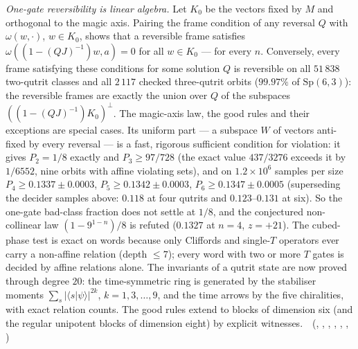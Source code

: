 \emph{One-gate reversibility is linear algebra.} Let $K_0$ be the vectors fixed by $M$ and orthogonal to the magic axis. Pairing
the frame condition of any reversal $Q$ with $\omega(w,\cdot)$, $w\in K_0$, shows that a reversible frame satisfies
$\omega((1-(QJ)^{-1})w,a)=0$ for all $w\in K_0$ --- for every $n$. Conversely, every frame satisfying these conditions for some
solution $Q$ is reversible on all $51\,838$ two-qutrit classes and all $2\,117$ checked three-qutrit orbits ($99.97\%$ of
$\mathrm{Sp}(6,3)$): the reversible frames are exactly the union over $Q$ of the subspaces $((1-(QJ)^{-1})K_0)^\perp$. The magic-axis law,
the good rules and their exceptions are special cases. Its uniform part --- a subspace $W$ of vectors anti-fixed by every
reversal --- is a fast, rigorous sufficient condition for violation: it gives $P_2=1/8$ exactly and $P_3\ge97/728$ (the exact value
$437/3276$ exceeds it by $1/6552$, nine orbits with affine violating sets), and on $1.2\times10^6$ samples per size $P_4\ge0.1337\pm0.0003$, $P_5\ge0.1342\pm0.0003$, $P_6\ge0.1347\pm0.0005$ (superseding the decider samples above: $0.118$ at four qutrits and $0.123$--$0.131$ at six). So the
one-gate bad-class fraction does not settle at $1/8$, and the conjectured non-collinear law $(1-9^{1-n})/8$ is refuted
($0.1327$ at $n=4$, $z=+21$). The cubed-phase test is exact on words because only Cliffords and single-$T$ operators ever carry a
non-affine relation (depth $\le7$); every word with two or more $T$ gates is decided by affine relations alone. The invariants of
a qutrit state are now proved through degree $20$: the time-symmetric ring is generated by the stabiliser moments
$\sum_s|\langle s|\psi\rangle|^{2k}$, $k=1,3,\dots,9$, and the time arrows by the five chiralities, with exact relation counts. The good
rules extend to blocks of dimension six (and the regular unipotent blocks of dimension eight) by explicit witnesses.
\tierT\,\tierC\ (, ,
, , ,
, )

